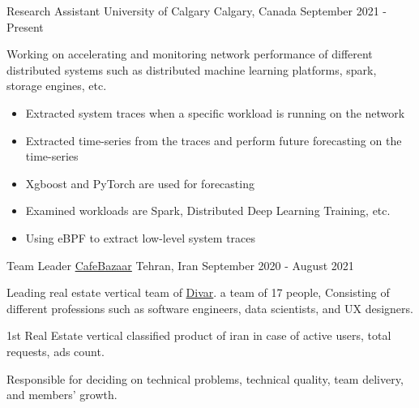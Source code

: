 

\begin{cventries}

\cventry
{Research Assistant} %
{University of Calgary} %
{Calgary, Canada} %
{September 2021 - Present} %
{ %
\begin{cvitems}
\item {Working on accelerating and monitoring network performance of different distributed systems such as distributed machine learning platforms, spark, storage engines, etc.}
\begin{itemize}
    \item Extracted system traces when a specific workload is running on the network
    \item Extracted time-series from the traces and perform future forecasting on the time-series
    \item Xgboost and PyTorch are used for forecasting
    \item Examined workloads are Spark, Distributed Deep Learning Training, etc.
    \item Using eBPF to extract low-level system traces
\end{itemize}
\end{cvitems}
}
\cventry
{Team Leader} %
{\href{https://cafebazaar.ir}{CafeBazaar}} %
{Tehran, Iran} %
{September 2020 - August 2021} %
{ %
\begin{cvitems}
\item {Leading real estate vertical team of \href{https://divar.ir}{Divar}. a team of 17 people, Consisting of different professions such as software engineers, data scientists, and UX designers.}
\item {1st Real Estate vertical classified product of iran in case of active users, total requests, ads count.}
\item {Responsible for deciding on technical problems, technical quality, team delivery, and members' growth.}

\end{cvitems}}
\end{cventries}
